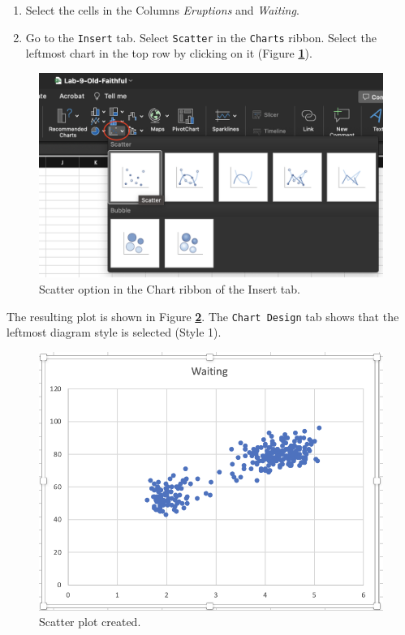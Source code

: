 \documentclass[
]{book}
\providecommand{\tightlist}{%
  \setlength{\itemsep}{0pt}\setlength{\parskip}{0pt}}
\begin{document}
\begin{enumerate}
\def\labelenumi{\arabic{enumi}.}
\tightlist
\item
  Select the cells in the Columns \emph{Eruptions} and \emph{Waiting}.
\item
  Go to the \texttt{Insert} tab. Select \texttt{Scatter} in the \texttt{Charts} ribbon. Select the leftmost chart in the top row by clicking on it (Figure \textbf{\ref{fig:scatter-plot}}).
\end{enumerate}

\begin{figure}

{\centering \includegraphics[width=0.65\linewidth]{images/scatter-plot} 

}

\caption{ Scatter option in the Chart ribbon of the Insert tab.}\label{fig:scatter-plot}
\end{figure}

The resulting plot is shown in Figure \textbf{\ref{fig:resulting-scatter-plot}}. The \texttt{Chart\ Design} tab shows that the leftmost diagram style is selected (Style 1).

\begin{figure}

{\centering \includegraphics[width=0.65\linewidth]{images/resulting-scatter-plot} 

}

\caption{ Scatter plot created.}\label{fig:resulting-scatter-plot}
\end{figure}
\end{document}
